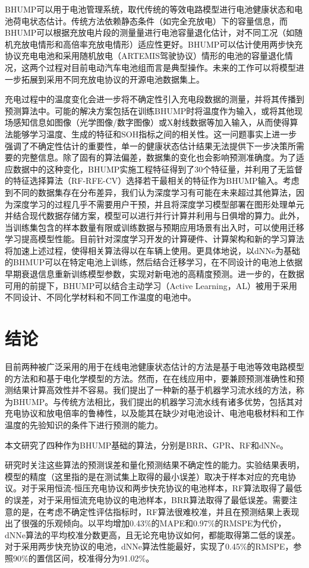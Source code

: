 \documentclass{article}
\begin{document}
BHUMP可以用于电池管理系统，取代传统的等效电路模型进行电池健康状态和电池荷电状态估计。传统方法依赖静态条件（如完全充放电）下的容量信息，而BHUMP可以根据充放电片段的测量量进行电池容量退化估计，对不同工况（如随机充放电情形和高倍率充放电情形）适应性更好。BHUMP可以估计使用两步快充协议充电电池和采用随机放电（ARTEMIS驾驶协议）情形的电池的容量退化情况，这两个过程对目前电动汽车电池组而言是典型操作。未来的工作可以将模型进一步拓展到采用不同充放电协议的开源电池数据集上\cite{Attia2020}。

充电过程中的温度变化会进一步将不确定性引入充电段数据的测量，并将其传播到预测算法中。可能的解决方案包括在训练BHUMP时将温度作为输入，或将其他现场感知信息如图像（光学图像/数字图像）或X射线数据\cite{Handoko2018}等加入输入，从而使得算法能够学习温度、生成的特征和SOH指标之间的相关性。这一问题事实上进一步强调了不确定性估计的重要性，单一的健康状态估计结果无法提供下一步决策所需要的完整信息。除了固有的算法偏差，数据集的变化也会影响预测准确度。为了适应数据中的这种变化，BHUMP实施工程特征得到了30个特征量，并利用了无监督的特征选择算法（RF-RFE-CV）选择若干最相关的特征作为BHUMP输入。考虑到不同的数据集存在分布差异，我们认为深度学习有可能在未来超过其他算法，因为深度学习的过程几乎不需要用户干预，并且将深度学习模型部署在图形处理单元并结合现代数据存储方案，模型可以进行并行计算并利用与日俱增的算力。此外，当训练集包含的样本数量有限或训练数据与预期应用场景有出入时，可以使用迁移学习提高模型性能。目前针对深度学习开发的计算硬件、计算架构和新的学习算法将加速上述过程，使得相关算法得以在车辆上使用。更具体地说，以dNNe为基础的BHMUP可以在特定电池上训练，然后结合迁移学习，在不同设计的电池上依据早期衰退信息重新训练模型参数，实现对新电池的高精度预测。进一步的，在数据可用的前提下，BHUMP可以结合主动学习（Active Learning，AL）被用于采用不同设计、不同化学材料和不同工作温度的电池中。

\section{结论}

目前两种被广泛采用的用于在线电池健康状态估计的方法是基于电池等效电路模型的方法和和基于电化学模型的方法。然而，在在线应用中，要兼顾预测准确性和预测结果计算高效性并不容易。我们提出了一种新的基于机器学习流水线的方法，称为BHUMP。与传统方法相比，我们提出的机器学习流水线有诸多优势，包括其对充电协议和放电倍率的鲁棒性，以及能其在缺少对电池设计、电池电极材料和工作温度的先验知识的条件下进行预测的能力。

本文研究了四种作为BHUMP基础的算法，分别是BRR、GPR、RF和dNNe。

研究时关注这些算法的预测误差和量化预测结果不确定性的能力。实验结果表明，模型的精度（这里指的是在测试集上取得的最小误差）取决于样本对应的充电协议。对于采用恒流-恒压充电协议和两步快充协议的电池样本，RF算法取得了最低的误差，对于采用恒流充电协议的电池样本，BRR算法取得了最低误差。需要注意的是，在考虑不确定性评估指标时，RF算法很难校准，并且在预测结果上表现出了很强的乐观倾向。以平均增加0.43\%的MAPE和0.97\%的RMSPE为代价，dNNe算法的平均校准分数更高，且无论充电协议如何，都能取得第二低的误差。对于采用两步快充协议的电池，dNNe算法性能最好，实现了0.45\%的RMSPE，参照90\%的置信区间，校准得分为91.02\%。
\end{document}
